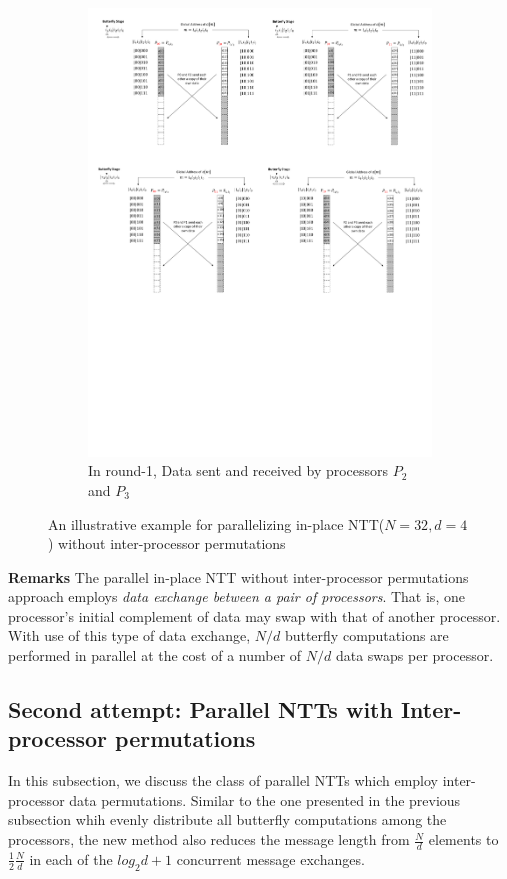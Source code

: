\documentclass[submission]{iacrtrans}
\theoremstyle{plain}
\begin{document}
\begin{figure}[!tb]
\begin{subfigure}[b]{.47\textwidth}
\includegraphics[width=\textwidth]{./fig/DataSwapWithoutPerm4.pdf}
\caption{In round-1, Data sent and received by processors $P_2$ and $P_3$}\label{fig:dataswap_without_perm4}
\end{subfigure}

\caption{An illustrative example for parallelizing in-place NTT($N=32,d=4$) without inter-processor permutations}\label{fig:dataswap_without_perm}
\end{figure}

\textbf{Remarks} The parallel in-place NTT without inter-processor permutations approach employs \textit{data exchange between a pair of processors}. That is, one processor's initial complement of data may swap with that of another processor. With use of this type of data exchange, $N/d$ butterfly computations are performed in parallel at the cost of a number of $N/d$ data swaps per processor.  


\subsection{Second attempt: Parallel NTTs with Inter-processor permutations}
In this subsection, we discuss the class of parallel NTTs which employ inter-processor data permutations. Similar to the one presented in the previous subsection whih evenly distribute all butterfly computations among the processors, the new method also reduces the message length from $\frac{N}{d}$ elements to $\frac{1}{2}\frac{N}{d}$ in each of the $log_2d+1$ concurrent message exchanges.
\end{document}
